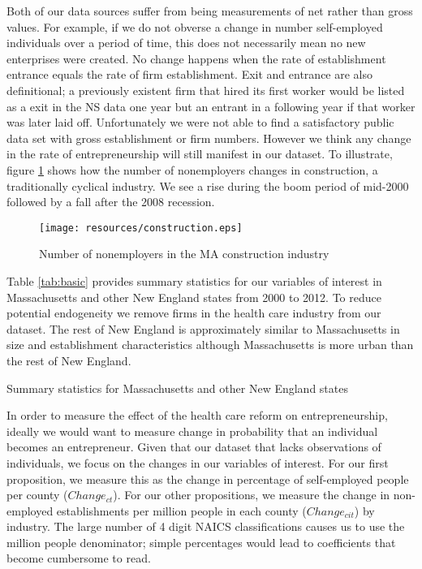 \documentclass[12pt]{article}
\begin{document}
Both of our data sources suffer from being measurements of net rather than gross values. For example, if  we do not obverse a change in number self-employed individuals over a period of time, this does not necessarily mean no new enterprises were created. No change happens when the rate of establishment entrance equals the rate of firm establishment. Exit and entrance are also definitional; a previously existent firm that hired its first worker would be listed as a exit in the NS data one year but an entrant in a following year if that worker was later laid off. Unfortunately we were not able to find a satisfactory public data set with gross establishment or firm numbers. However we think any change in the rate of entrepreneurship will still manifest in our dataset. To illustrate, figure \ref{fig:construct} shows how the number of nonemployers changes in construction, a traditionally cyclical industry. We see a rise during the boom period of mid-2000 followed by a fall after the 2008 recession. 

\begin{figure}[H]
	\centering
	\texttt{[image: resources/construction.eps]}
	\caption{Number of nonemployers in the MA construction industry}
	\label{fig:construct}
\end{figure}

Table \ref{tab:basic} provides summary statistics for our variables of interest in Massachusetts and other New England states from 2000 to 2012. To reduce potential endogeneity we remove firms in the health care industry from our dataset. The rest of New England is approximately similar to Massachusetts in size and establishment characteristics although Massachusetts is more urban than the rest of New England. 

\begin{table}[H]
	\centering
	\caption{Summary statistics for Massachusetts and other New England states}
	
	\label{tab:basic}
\end{table}

In order to measure the effect of the health care reform on entrepreneurship, ideally we would want to measure change in probability that an individual becomes an entrepreneur. Given that our dataset that lacks observations of individuals, we focus on the changes in our variables of interest. For our first proposition, we measure this as the change in percentage of self-employed people per county ($Change_{ct}$). For our other propositions, we measure the change in non-employed establishments per million people in each county ($Change_{cit}$) by industry. The large number of 4 digit NAICS classifications causes us to use the million people denominator; simple percentages would lead to coefficients that become cumbersome to read. 
\end{document}
